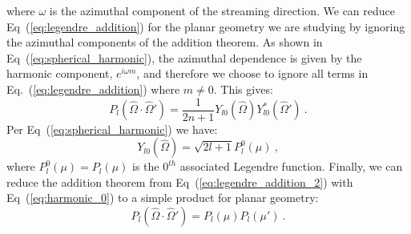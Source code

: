 where $\omega$ is the azimuthal component of the streaming
direction. We can reduce Eq~(\ref{eq:legendre_addition}) for the
planar geometry we are studying by ignoring the azimuthal components
of the addition theorem. As shown in Eq~(\ref{eq:spherical_harmonic}),
the azimuthal dependence is given by the harmonic component, $e^{i
  \omega m}$, and therefore we choose to ignore all terms in
Eq.~(\ref{eq:legendre_addition}) where $m \neq 0$. This gives:
\begin{equation}
  P_l(\hat{\Omega} \cdot \hat{\Omega}') = \frac{1}{2n+1}
  Y_{l0}(\hat{\Omega})Y^*_{l0}(\hat{\Omega}')\:.
  \label{eq:legendre_addition_2}
\end{equation}
Per Eq~(\ref{eq:spherical_harmonic}) we have:
\begin{equation}
  Y_{l0}(\hat{\Omega}) = \sqrt{2l+1}P_l^0(\mu)\:,
  \label{eq:harmonic_0}
\end{equation}
where $P_l^0(\mu) = P_l(\mu)$ is the $0^{th}$ associated Legendre
function. Finally, we can reduce the addition theorem from
Eq~(\ref{eq:legendre_addition_2}) with Eq~(\ref{eq:harmonic_0}) to a
simple product for planar geometry:
\begin{equation}
  P_l(\hat{\Omega} \cdot \hat{\Omega}') = P_l(\mu)P_l(\mu')\:.
  \label{eq:legendre_addition_3}
\end{equation}

